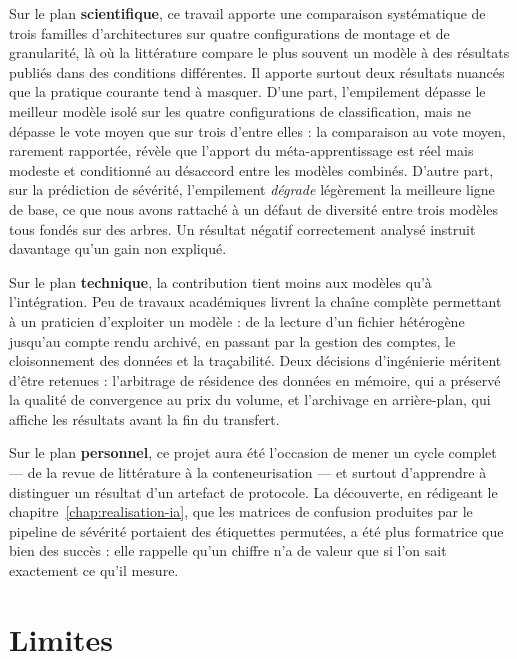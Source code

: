 Sur le plan \textbf{scientifique}, ce travail apporte une comparaison systématique de
trois familles d'architectures sur quatre configurations de montage et de granularité,
là où la littérature compare le plus souvent un modèle à des résultats publiés dans des
conditions différentes. Il apporte surtout deux résultats nuancés que la pratique
courante tend à masquer. D'une part, l'empilement dépasse le meilleur modèle isolé sur
les quatre configurations de classification, mais ne dépasse le vote moyen que sur trois
d'entre elles : la comparaison au vote moyen, rarement rapportée, révèle que l'apport
du méta-apprentissage est réel mais modeste et conditionné au désaccord entre les
modèles combinés. D'autre part, sur la prédiction de sévérité, l'empilement
\emph{dégrade} légèrement la meilleure ligne de base, ce que nous avons rattaché à un
défaut de diversité entre trois modèles tous fondés sur des arbres. Un résultat négatif
correctement analysé instruit davantage qu'un gain non expliqué.

Sur le plan \textbf{technique}, la contribution tient moins aux modèles qu'à
l'intégration. Peu de travaux académiques livrent la chaîne complète permettant à un
praticien d'exploiter un modèle : de la lecture d'un fichier hétérogène jusqu'au compte
rendu archivé, en passant par la gestion des comptes, le cloisonnement des données et
la traçabilité. Deux décisions d'ingénierie méritent d'être retenues : l'arbitrage de
résidence des données en mémoire, qui a préservé la qualité de convergence au prix du
volume, et l'archivage en arrière-plan, qui affiche les résultats avant la fin du
transfert.

Sur le plan \textbf{personnel}, ce projet aura été l'occasion de mener un cycle complet
— de la revue de littérature à la conteneurisation — et surtout d'apprendre à
distinguer un résultat d'un artefact de protocole. La découverte, en rédigeant le
chapitre~\ref{chap:realisation-ia}, que les matrices de confusion produites par le
pipeline de sévérité portaient des étiquettes permutées, a été plus formatrice que bien
des succès : elle rappelle qu'un chiffre n'a de valeur que si l'on sait exactement ce
qu'il mesure.

\section*{Limites}

